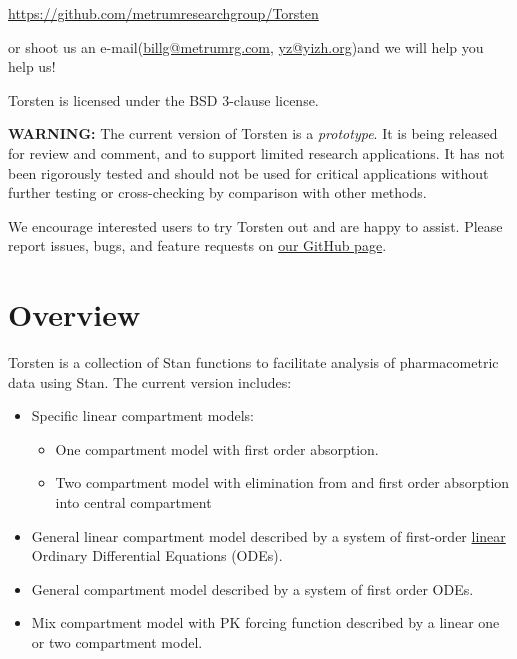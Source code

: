\documentclass[11pt, reqno, oneside]{amsbook}
\numberwithin{equation}{chapter}
\numberwithin{figure}{chapter}
\numberwithin{table}{chapter}
\theoremstyle{remark}
\begin{document}
\href{https://github.com/metrumresearchgroup/Torsten}{https://github.com/metrumresearchgroup/Torsten} 

or shoot us an
e-mail(\href{mailto:billg@metrumrg.com}{billg@metrumrg.com}, \href{mailto:yz@yizh.org}{yz@yizh.org})and we will help you help us!

Torsten is licensed under the BSD 3-clause license.

\begin{mdframed}
\textbf{WARNING:} The current version of Torsten is a \emph{prototype}. It
is being released for review and comment, and to support limited
research applications. It has not been rigorously tested and should
not be used for critical applications without further testing or
cross-checking by comparison with other methods.

We encourage interested users to try Torsten out and are happy to
assist. Please report issues, bugs, and feature requests on
\href{https://github.com/metrumresearchgroup/stan}{our GitHub page}.
\end{mdframed}

\section{Overview}
\label{overview}
Torsten is a collection of Stan functions to facilitate analysis of
pharmacometric data using Stan. The current version
includes:
\begin{itemize}
\item Specific linear compartment models:
\begin{itemize}
\item One compartment model with first order absorption.
\item Two compartment model with elimination from and first order absorption into central compartment
\end{itemize}
\item General linear compartment model described by a system of first-order \underline{linear} Ordinary Differential Equations (ODEs).
\item General compartment model described by a system of first order ODEs.
\item Mix compartment model with PK forcing function described by a linear one or two compartment model.
\end{itemize}
\end{document}
